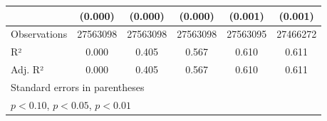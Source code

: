 \begin{table}[H]
\begin{tabular}{l*{5}{c}}
                    &     (0.000)         &     (0.000)         &     (0.000)         &     (0.001)         &     (0.001)         \\
\midrule
Observations        &    27563098         &    27563098         &    27563098         &    27563095         &    27466272         \\
R²                  &       0.000         &       0.405         &       0.567         &       0.610         &       0.611         \\
Adj. R²             &       0.000         &       0.405         &       0.567         &       0.610         &       0.611         \\
\bottomrule
\multicolumn{6}{l}{\footnotesize Standard errors in parentheses}\\
\multicolumn{6}{l}{\footnotesize \sym{*} \(p<0.10\), \sym{**} \(p<0.05\), \sym{***} \(p<0.01\)}\\
\end{tabular}
\end{table}
